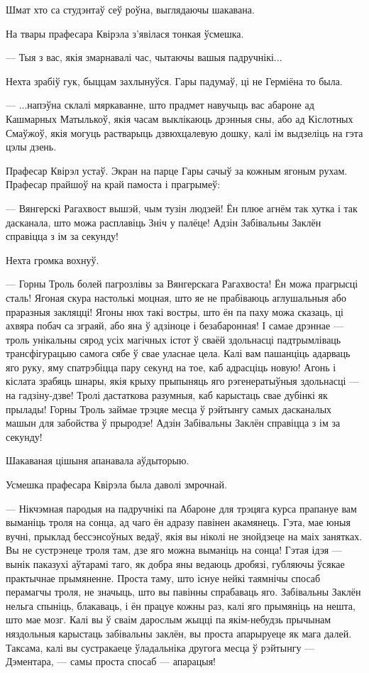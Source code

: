Шмат хто са студэнтаў сеў роўна, выглядаючы шакавана.

На твары прафесара Квірэла з'явілася тонкая ўсмешка. 

--- Тыя з вас, якія змарнавалі час, чытаючы вашыя падручнікі...

Нехта зрабіў гук, быццам захлынуўся. Гары падумаў, ці не Герміёна то была.

--- ...напэўна склалі мяркаванне, што прадмет навучыць вас абароне ад Кашмарных 
Матылькоў, якія часам выклікаюць дрэнныя сны, або ад Кіслотных Смаўжоў, якія могуць
растварыць дзвюхцалевую дошку, калі ім выдзеліць на гэта цэлы дзень.

Прафесар Квірэл устаў. Экран на парце Гары сачыў за кожным ягоным рухам. 
Прафесар прайшоў на край памоста і прагрымеў:

--- Вянгерскі Рагахвост вышэй, чым тузін людзей! Ён плюе агнём так хутка і так дасканала,
што можа расплавіць Зніч у палёце! Адзін Забівальны Заклён справіцца з ім за секунду!

Нехта громка вохнуў.

--- Горны Троль болей пагрозлівы за Вянгерскага Рагахвоста! Ён можа прагрысці 
сталь! Ягоная скура настолькі моцная, што яе не прабіваюць аглушальныя або праразныя
закляцці! Ягоны нюх такі востры, што ён па паху можа сказаць, ці ахвяра побач са 
зграяй, або яна ў адзіноце і безабаронная! І самае дрэннае --- троль унікальны 
сярод усіх магічных істот ў сваёй здольнасці падтрымліваць трансфігурацыю самога сябе ў 
свае уласнае цела. Калі вам пашанціць адарваць яго руку, яму спатрэбіцца 
пару секунд на тое, каб адрасціць новую! Агонь і кіслата зрабяць шнары, якія 
крыху прыпыняць яго рэгенератыўныя здольнасці --- на гадзіну-дзве!
Тролі дастаткова разумныя, каб карыстаць свае дубінкі як прылады! 
Горны Троль займае трэцяе месца ў рэйтынгу самых дасканалых машын для забойства 
ў прыродзе! Адзін Забівальны Заклён справіцца з ім за секунду!

Шакаваная цішыня апанавала аўдыторыю.

Усмешка прафесара Квірэла была даволі змрочнай.

--- Нікчэмная пародыя на падручнікі па Абароне для трэцяга курса прапануе вам 
выманіць троля на сонца, ад чаго ён адразу павінен акамянець. Гэта, мае юныя вучні,
прыклад бессэнсоўных ведаў, якія вы ніколі не знойдзеце на маіх занятках.
Вы не сустрэнеце троля там, дзе яго можна выманіць на сонца! Гэтая ідэя --- 
вынік паказухі аўтарамі таго, як добра яны ведаюць дробязі, губляючы ўсякае
практычнае прымяненне. Проста таму, што існуе нейкі таямнічы спосаб перамагчы троля,
не значыць, што вы павінны спрабаваць яго. Забівальны Заклён нельга спыніць,
блакаваць, і ён працуе кожны раз, калі яго прымяніць на нешта, што мае мозг. 
Калі вы ў сваім дарослым жыцці па якім-небудзь прычынам няздольныя карыстаць 
забівальны заклён, вы проста апарыруеце як мага далей. Таксама, калі вы сустракаеце
ўладальніка другога месца ў рэйтынгу --- Дэментара, --- самы проста спосаб --- 
апарацыя!

